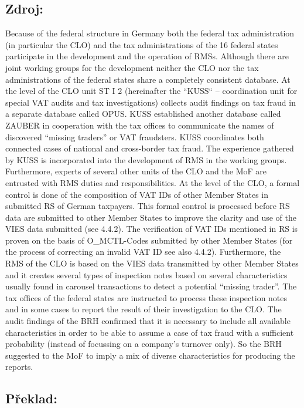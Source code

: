 \documentclass[10pt]{article}
\begin{document}
\subsection*{Zdroj:}

Because of the federal structure in Germany both the federal tax administration (in particular the CLO) and the tax administrations of the 16 federal states participate in the development and the operation of RMSs.
Although there are joint working groups for the development neither the CLO nor the tax administrations of the federal states share a completely consistent database.
At the level of the CLO unit ST I 2 (hereinafter the “KUSS“ – coordination unit for special VAT audits and tax investigations) collects audit findings on tax fraud in a separate database called OPUS.
KUSS established another database called ZAUBER in cooperation with the tax offices to communicate the names of discovered “missing traders” or VAT fraudsters.
KUSS coordinates both connected cases of national and cross-border tax fraud.
The experience gathered by KUSS is incorporated into the development of RMS in the working groups.
Furthermore, experts of several other units of the CLO and the MoF are entrusted with RMS duties and responsibilities.
At the level of the CLO, a formal control is done of the composition of VAT IDs of other Member States in submitted RS of German taxpayers.
This formal control is processed before RS data are submitted to other Member States to improve the clarity and use of the VIES data submitted (see 4.4.2).
The verification of VAT IDs mentioned in RS is proven on the basis of O\_MCTL-Codes submitted by other Member States (for the process of correcting an invalid VAT ID see also 4.4.2).
Furthermore, the RMS of the CLO is based on the VIES data transmitted by other Member States and it creates several types of inspection notes based on several characteristics usually found in carousel transactions to detect a potential “missing trader”.
The tax offices of the federal states are instructed to process these inspection notes and in some cases to report the result of their investigation to the CLO.
The audit findings of the BRH confirmed that it is necessary to include all available characteristics in order to be able to assume a case of tax fraud with a sufficient probability (instead of focussing on a company’s turnover only).
So the BRH suggested to the MoF to imply a mix of diverse characteristics for producing the reports.


\pagebreak

\subsection*{Překlad:}
\end{document}
